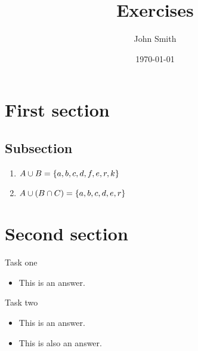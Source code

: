 \documentclass{exercises}
\title{Exercises}
\author{John Smith}
\date{\today}
\begin{document}
\maketitle

\section{First section}

  \subsection{Subsection}

  \begin{enumerate}
    \item $A \cup B = \{a, b, c, d, f, e, r, k\}$
    \item $A \cup (B \cap C) = \{a, b, c, d, e, r\}$
  \end{enumerate}

  \section{Second section}

  \begin{subtasks}
    \item Task one

      \begin{itemize}
        \item This is an answer.
      \end{itemize}

    \item Task two
      \begin{itemize}
        \item This is an answer.
        \item This is also an answer.
      \end{itemize}

  \end{subtasks}
  
\end{document}
